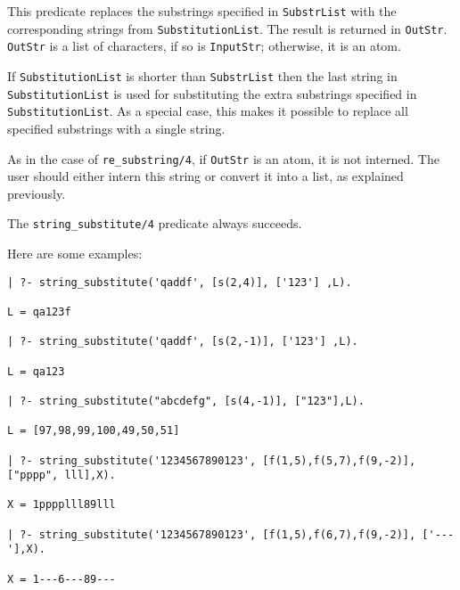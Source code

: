 \begin{description}
This predicate replaces the substrings specified in {\tt SubstrList} with
the corresponding strings from {\tt SubstitutionList}.  The result is
returned in {\tt OutStr}. {\tt OutStr} is a list of characters, if so is
{\tt InputStr}; otherwise, it is an atom.

If {\tt SubstitutionList} is shorter than {\tt SubstrList} then the last
string in {\tt SubstitutionList} is used for substituting the extra
substrings specified in {\tt SubstitutionList}. As a special case, this
makes it possible to replace all specified substrings with a single string.

As in the case of {\tt re\_substring/4}, if {\tt OutStr} is an atom, it is
not interned.  The user should either intern this string or convert it into
a list, as explained previously.

The \verb|string_substitute/4| predicate always succeeds.

Here are some examples:
\begin{verbatim}
| ?- string_substitute('qaddf', [s(2,4)], ['123'] ,L).

L = qa123f

| ?- string_substitute('qaddf', [s(2,-1)], ['123'] ,L).

L = qa123

| ?- string_substitute("abcdefg", [s(4,-1)], ["123"],L).

L = [97,98,99,100,49,50,51]

| ?- string_substitute('1234567890123', [f(1,5),f(5,7),f(9,-2)], ["pppp", lll],X).

X = 1pppplll89lll

| ?- string_substitute('1234567890123', [f(1,5),f(6,7),f(9,-2)], ['---'],X).

X = 1---6---89---
\end{verbatim}


\end{description}
